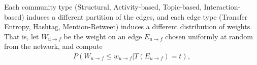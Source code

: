 
Each community type (Structural, Activity-based, Topic-based, Interaction-based) induces a different partition of the edges, and each edge type (Transfer Entropy, Hashtag, Mention-Retweet) induces a different distribution of weights. That is, let $W_{u \to f}$ be the weight on an edge $E_{u \to f}$ chosen uniformly at random from the network, and compute
\begin{align}
	P(W_{u \to f} \leq w_{u \to f} | T(E_{u \to f}) = t),
\end{align}
